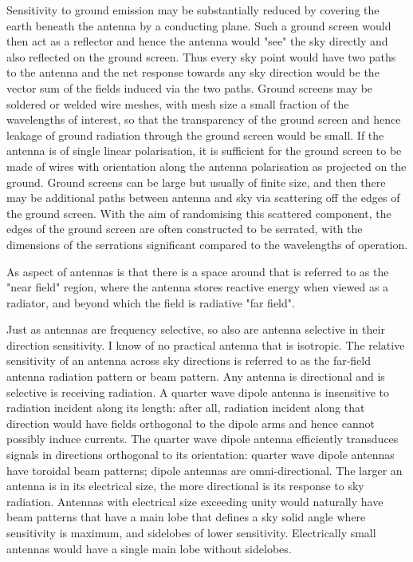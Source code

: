   Sensitivity to ground emission may be substantially reduced by covering the earth beneath the antenna by a conducting plane.  Such a ground screen would then act as a reflector and hence the antenna would "see" the sky directly and also reflected on the ground screen.  Thus every sky point would have two paths to the antenna and the net response towards any sky direction would be the vector sum of the fields induced via the two paths.  Ground screens may be soldered or welded wire meshes, with mesh size a small fraction of the wavelengths of interest, so that the transparency of the ground screen and hence leakage of ground radiation through the ground screen would be small. If the antenna is of single linear polarisation, it is sufficient for the ground screen to be made of wires with orientation along the antenna polarisation as projected on the ground.  Ground screens can be large but usually of finite size, and then there may be additional paths between antenna and sky via scattering off the edges of the ground screen.  With the aim of randomising this scattered component, the edges of the ground screen are often constructed to be serrated, with the dimensions of the serrations significant compared to the wavelengths of operation. 
  
  As aspect of antennas is that there is a space around that is referred to as the "near field" region, where the antenna stores reactive energy when viewed as a radiator, and beyond which the field is radiative "far field".
  
  Just as antennas are frequency selective, so also are antenna selective in their direction sensitivity.  I know of no practical antenna that is isotropic.  The relative sensitivity of an antenna across sky directions is referred to as the far-field antenna radiation pattern or beam pattern.  Any antenna is directional and is selective is receiving radiation. A quarter wave dipole antenna is insensitive to radiation incident along its length: after all, radiation incident along that direction would have fields orthogonal to the dipole arms and hence cannot possibly induce currents.  The quarter wave dipole antenna efficiently transduces signals in directions orthogonal to its orientation: quarter wave dipole antennas have toroidal beam patterns; dipole antennas are omni-directional. The larger an antenna is in its electrical size, the more directional is its response to sky radiation.  Antennas with electrical size exceeding unity would naturally have beam patterns that have a main lobe that defines a sky solid angle where sensitivity is maximum, and sidelobes of lower sensitivity.  Electrically small antennas would have a single main lobe without sidelobes.
  
